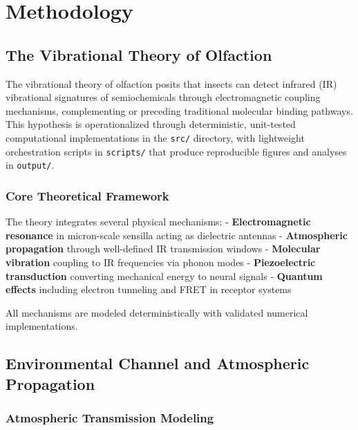 \documentclass[
  13pt,
  a4paperpaper,
  12pt]{article}
\author{}
\date{}
\newcommand{\passthrough}[1]{#1}
\let\oldsection\section
\renewcommand{\section}{\clearpage\oldsection}
\begin{document}
{
\hypersetup{linkcolor=black}
\setcounter{tocdepth}{3}
\tableofcontents
}
\section{Methodology}\label{sec:methodology}

\subsection{The Vibrational Theory of
Olfaction}\label{the-vibrational-theory-of-olfaction}

The vibrational theory of olfaction posits that insects can detect
infrared (IR) vibrational signatures of semiochemicals through
electromagnetic coupling mechanisms, complementing or preceding
traditional molecular binding pathways. This hypothesis is
operationalized through deterministic, unit-tested computational
implementations in the \passthrough{\lstinline!src/!} directory, with
lightweight orchestration scripts in \passthrough{\lstinline!scripts/!}
that produce reproducible figures and analyses in
\passthrough{\lstinline!output/!}.

\subsubsection{Core Theoretical
Framework}\label{core-theoretical-framework}

The theory integrates several physical mechanisms: -
\textbf{Electromagnetic resonance} in micron-scale sensilla acting as
dielectric antennas - \textbf{Atmospheric propagation} through
well-defined IR transmission windows - \textbf{Molecular vibration}
coupling to IR frequencies via phonon modes - \textbf{Piezoelectric
transduction} converting mechanical energy to neural signals -
\textbf{Quantum effects} including electron tunneling and FRET in
receptor systems

All mechanisms are modeled deterministically with validated numerical
implementations.

\subsection{Environmental Channel and Atmospheric
Propagation}\label{environmental-channel-and-atmospheric-propagation}

\subsubsection{Atmospheric Transmission
Modeling}\label{atmospheric-transmission-modeling}
\end{document}

